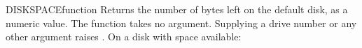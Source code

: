 \begin{XbaseEntry}{DISKSPACE}{function}
Returns the number of bytes left on the default disk, as a numeric value.
\Syntax
{}
\Usage
The function takes no argument. Supplying a drive number or any other
argument raises .
\Examples
On a disk with space available:
\end{XbaseEntry}

